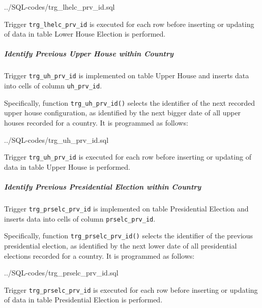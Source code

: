 %
{../SQL-codes/trg_lhelc_prv_id.sql}

Trigger \texttt{\footnotesize trg\_lhelc\_prv\_id} is executed for each row before inserting or updating of data in table Lower House Election is performed.  

\subparagraph{Identify Previous Upper House within Country}\label{trg_uh_prv_id}
Trigger \texttt{\footnotesize trg\_uh\_prv\_id} is implemented on table Upper House and inserts data into cells of column \texttt{\footnotesize uh\_prv\_id}. 

Specifically, function \texttt{\footnotesize trg\_uh\_prv\_id()}  selects the identifier of the next recorded upper house configuration, as identified by the next bigger date of all upper houses recorded for a country.
It is programmed as follows:

%
{../SQL-codes/trg_uh_prv_id.sql}

Trigger \texttt{\footnotesize trg\_uh\_prv\_id} is executed for each row before inserting or updating of data in table Upper House is performed.

\subparagraph{Identify Previous Presidential Election within Country}\label{trg_prselc_prv_id}
Trigger \texttt{\footnotesize trg\_prselc\_prv\_id} is implemented on table Presidential Election and inserts data into cells of column \texttt{\footnotesize prselc\_prv\_id}. 

Specifically, function \texttt{\footnotesize trg\_prselc\_prv\_id()} selects the identifier of the previous presidential election, as identified by the next lower date of all presidential elections recorded for a country.
It is programmed as follows:

%
{../SQL-codes/trg_prselc_prv_id.sql}

Trigger \texttt{\footnotesize trg\_prselc\_prv\_id} is executed for each row before inserting or updating of data in table Presidential Election is performed. 
